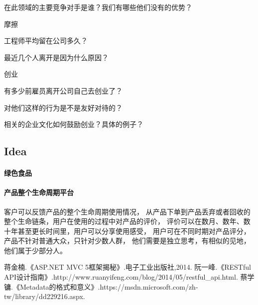 \documentclass{book}
\begin{document}
在此领域的主要竞争对手是谁？我们有哪些他们没有的优势？

摩擦

工程师平均留在公司多久？

最近几个人离开是因为什么原因？

创业

有多少前雇员离开公司自己去创业了？

对他们这样的行为是不是友好对待的？

相关的企业文化如何鼓励创业？具体的例子？

\subsection{Idea}

\paragraph{绿色食品}

\paragraph{产品整个生命周期平台}客户可以反馈产品的整个生命周期使用情况，
从产品下单到产品丢弃或者回收的整个生命链条，用户在使用的过程中对产品的评价，
评价可以在数月、数年、数十年甚至更长时间里，用户可以分享使用感受，
用户可在不同时期对产品评分，产品不针对普通大众，只针对少数人群，
他们需要是独立思考，有相似的见地，他们属于少部分人。

\begin{thebibliography}{0}
蒋金楠.《ASP.NET MVC 5框架揭秘》.电子工业出版社,2014.
阮一峰.《RESTful API设计指南》.http://www.ruanyifeng.com/blog/2014/05/restful\_api.html.
蔡学镛.《Metadata的格式和意义》.https://msdn.microsoft.com/zh-tw/library/dd229216.aspx.
\end{thebibliography}

\end{document}
